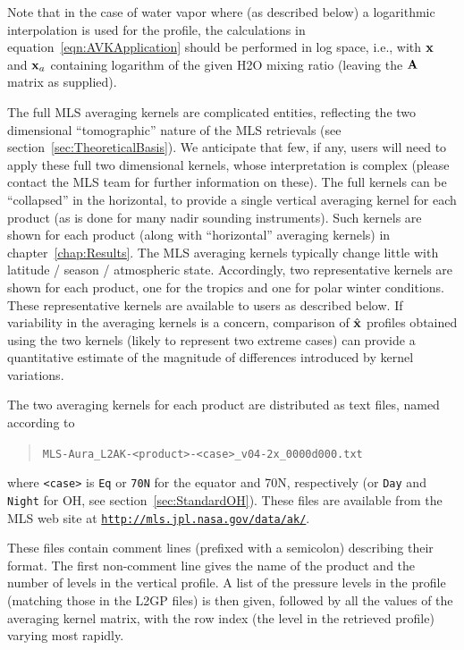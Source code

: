 \documentclass[11pt,draft]{report}
\begin{document}
Note that in the case of water vapor where (as described below) a
logarithmic interpolation is used for the profile, the calculations in
equation~\ref{eqn:AVKApplication} should be performed in log space,
i.e., with $\mathbf{x}$ and $\mathbf{x}_a$ containing logarithm of the given
H\cs2O mixing ratio (leaving the $\mathbf{A}$ matrix as supplied).

The full MLS averaging kernels are complicated entities, reflecting the
two dimensional ``tomographic'' nature of the MLS retrievals (see
section~\ref{sec:TheoreticalBasis}).  We anticipate that few, if any,
users will need to apply these full two dimensional kernels, whose
interpretation is complex (please contact the MLS team for further
information on these).  The full kernels can be ``collapsed'' in the
horizontal, to provide a single vertical averaging kernel for each
product (as is done for many nadir sounding instruments).  Such kernels
are shown for each product (along with ``horizontal'' averaging kernels)
in chapter~\ref{chap:Results}.  The MLS averaging kernels typically
change little with latitude / season / atmospheric state.  Accordingly,
two representative kernels are shown for each product, one for the
tropics and one for polar winter conditions.  These representative
kernels are available to users as described below.  If variability in
the averaging kernels is a concern, comparison of $\hat{\mathbf{x}}$ profiles
obtained using the two kernels (likely to represent two extreme cases)
can provide a quantitative estimate of the magnitude of differences
introduced by kernel variations.

The two averaging kernels for each product are distributed as text
files, named according to
\begin{quote}
\verb+MLS-Aura_L2AK-<product>-<case>_v04-2x_0000d000.txt+
\end{quote}
where \verb+<case>+ is \verb+Eq+ or \verb+70N+ for the equator and
70\degsym N, respectively (or \verb+Day+ and \verb+Night+ for OH, see
section~\ref{sec:StandardOH}).  These files are available from the MLS
web site at
\href{http://mls.jpl.nasa.gov/data/ak/}{\texttt{http://mls.jpl.nasa.gov/data/ak/}}.

These files contain comment lines (prefixed with a semicolon) describing
their format.  The first non-comment line gives the name of the product
and the number of levels in the vertical profile.  A list of the
pressure levels in the profile (matching those in the L2GP files) is
then given, followed by all the values of the averaging kernel matrix,
with the row index (the level in the retrieved profile) varying most
rapidly.
\end{document}
